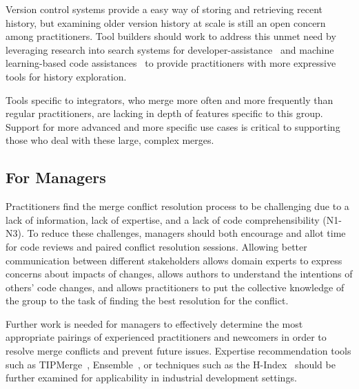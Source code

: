 Version control systems provide a easy way of storing and retrieving recent history, but examining older version history at scale is still an open concern among practitioners.
Tool builders should work to address this unmet need by leveraging research into search systems for developer-assistance~\cite{nabi2016putting} and machine learning-based code assistances~\cite{bradley2011history_exploration} to provide practitioners with more expressive tools for history exploration.

Tools specific to integrators, who merge more often and more frequently than regular practitioners, are lacking in depth of features specific to this group.
Support for more advanced and more specific use cases is critical to supporting those who deal with these large, complex merges. 

\subsection{For Managers}
Practitioners find the merge conflict resolution process to be challenging due to a lack of information, lack of expertise, and a lack of code comprehensibility (N1-N3). 
To reduce these challenges, managers should both encourage and allot time for code reviews and paired conflict resolution sessions. 
Allowing better communication between different stakeholders allows domain experts to express concerns about impacts of changes, allows authors to understand the intentions of others' code changes, and allows practitioners to put the collective knowledge of the group to the task of finding the best resolution for the conflict.

Further work is needed for managers to effectively determine the most appropriate pairings of experienced practitioners and newcomers in order to resolve merge conflicts and prevent future issues.
Expertise recommendation tools such as TIPMerge~\cite{CostaSarma}, Ensemble~\cite{xiang2008ensemble}, or techniques such as the H-Index~\cite{bornmann2005does} should be further examined for applicability in industrial development settings.